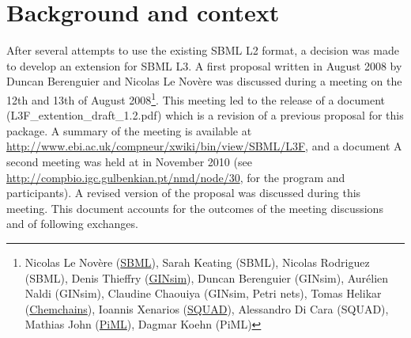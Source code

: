 
\section{Background and context}
\label{background}

After several attempts to use the existing SBML L2 format, a decision was made to develop an extension for SBML L3.
A first proposal written in August 2008 by Duncan Berenguier and Nicolas Le Nov\`ere was discussed during a meeting on the 12th and 13th of August 2008\footnote{Nicolas Le Nov\`ere (\href{http://www.sbml.org}{SBML}), Sarah Keating (SBML), Nicolas	Rodriguez (SBML), Denis Thieffry (\href{http://gin.univ-mrs.fr/}{GINsim}), Duncan Berenguier (GINsim), Aur\'elien Naldi (GINsim), Claudine Chaouiya (GINsim, Petri nets), Tomas Helikar (\href{http://www.bioinformatics.org/chemchains/wiki/}{Chemchains}), Ioannis Xenarios (\href{http://www.enfin.org/dokuwiki/doku.php?id=squad:start}{SQUAD}), Alessandro Di Cara (SQUAD), Mathias John (\href{http://piml.sourceforge.net/}{PiML}), Dagmar Koehn (PiML)}. 
This meeting led to the release of a document (L3F\_extention\_draft\_1.2.pdf) which is a revision of a previous proposal for this package. A summary of the meeting is available at \url{http://www.ebi.ac.uk/compneur/xwiki/bin/view/SBML/L3F}, and a document 
\medskip
A second meeting was held at in November 2010 (see \url{http://compbio.igc.gulbenkian.pt/nmd/node/30}, for the program and participants). A revised version of the proposal was discussed during this meeting.
This document accounts for the outcomes of the meeting discussions and of following exchanges. 
